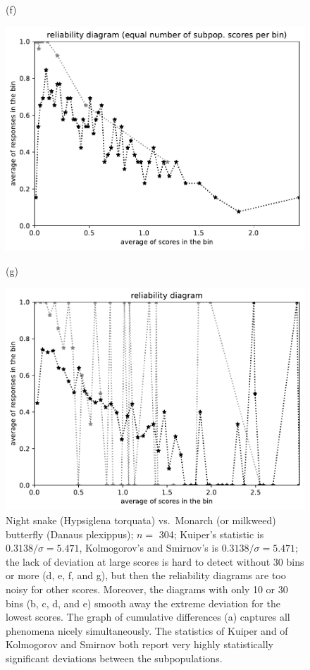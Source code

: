 \documentclass{article}
\newlength{\imsize}
\begin{document}
\begin{figure}
\begin{centering}
(f)
\parbox{\imsize}{\includegraphics[width=\imsize]
{../codes/unweighted/nll-1-60-night-snake-Hypsiglena-torquata_323-monarch-monarch-butterfly-milkweed-butterfly-Danaus-plexippusequisamps50.pdf}}
\quad\quad
(g)
\parbox{\imsize}{\includegraphics[width=\imsize]
{../codes/unweighted/nll-1-60-night-snake-Hypsiglena-torquata_323-monarch-monarch-butterfly-milkweed-butterfly-Danaus-plexippusequiscore50.pdf}}

\end{centering}
\caption{Night snake (Hypsiglena torquata) vs.\ Monarch (or milkweed) butterfly
         (Danaus plexippus); $n =$ 304;
         Kuiper's statistic is $0.3138 / \sigma = 5.471$,
         Kolmogorov's and Smirnov's is $0.3138 / \sigma = 5.471$;
         the lack of deviation at large scores is hard to detect
         without 30 bins or more (d, e, f, and g),
         but then the reliability diagrams are too noisy for other scores.
         Moreover, the diagrams with only 10 or 30 bins (b, c, d, and e)
         smooth away the extreme deviation for the lowest scores.
         The graph of cumulative differences (a) captures all phenomena nicely
         simultaneously. The statistics of Kuiper and of Kolmogorov and Smirnov
         both report very highly statistically significant deviations
         between the subpopulations.
}
\label{night-snake_monarch-butterfly}
\end{figure}
\end{document}
